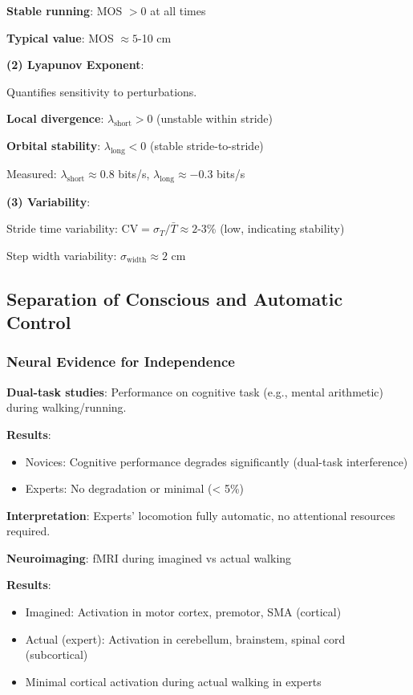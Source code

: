 \documentclass[11pt,onecolumn]{article}
\begin{document}
\textbf{Stable running}: MOS $> 0$ at all times

\textbf{Typical value}: MOS $\approx 5$-10 cm

\textbf{(2) Lyapunov Exponent}:

Quantifies sensitivity to perturbations.

\textbf{Local divergence}: $\lambda_{\text{short}} > 0$ (unstable within stride)

\textbf{Orbital stability}: $\lambda_{\text{long}} < 0$ (stable stride-to-stride)

Measured: $\lambda_{\text{short}} \approx 0.8$ bits/s, $\lambda_{\text{long}} \approx -0.3$ bits/s

\textbf{(3) Variability}:

Stride time variability: $\text{CV} = \sigma_T / \bar{T} \approx 2$-3\% (low, indicating stability)

Step width variability: $\sigma_{\text{width}} \approx 2$ cm

\subsection{Separation of Conscious and Automatic Control}

\subsubsection{Neural Evidence for Independence}

\textbf{Dual-task studies}: Performance on cognitive task (e.g., mental arithmetic) during walking/running.

\textbf{Results}:
\begin{itemize}
\item Novices: Cognitive performance degrades significantly (dual-task interference)
\item Experts: No degradation or minimal (< 5\%)
\end{itemize}

\textbf{Interpretation}: Experts' locomotion fully automatic, no attentional resources required.

\textbf{Neuroimaging}: fMRI during imagined vs actual walking

\textbf{Results}:
\begin{itemize}
\item Imagined: Activation in motor cortex, premotor, SMA (cortical)
\item Actual (expert): Activation in cerebellum, brainstem, spinal cord (subcortical)
\item Minimal cortical activation during actual walking in experts
\end{itemize}
\end{document}
